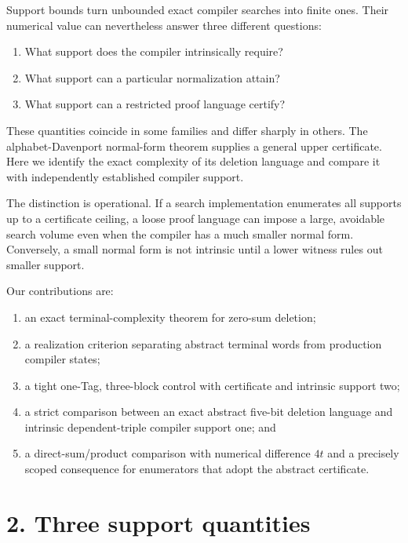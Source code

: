 \documentclass[
  11pt,
]{article}
\providecommand{\tightlist}{%
  \setlength{\itemsep}{0pt}\setlength{\parskip}{0pt}}
\begin{document}
Support bounds turn unbounded exact compiler searches into finite ones.
Their numerical value can nevertheless answer three different questions:

\begin{enumerate}
\def\labelenumi{\arabic{enumi}.}
\tightlist
\item
  What support does the compiler intrinsically require?
\item
  What support can a particular normalization attain?
\item
  What support can a restricted proof language certify?
\end{enumerate}

These quantities coincide in some families and differ sharply in others.
The alphabet-Davenport normal-form theorem supplies a general upper
certificate. Here we identify the exact complexity of its deletion
language and compare it with independently established compiler support.

The distinction is operational. If a search implementation enumerates
all supports up to a certificate ceiling, a loose proof language can
impose a large, avoidable search volume even when the compiler has a
much smaller normal form. Conversely, a small normal form is not
intrinsic until a lower witness rules out smaller support.

Our contributions are:

\begin{enumerate}
\def\labelenumi{\arabic{enumi}.}
\tightlist
\item
  an exact terminal-complexity theorem for zero-sum deletion;
\item
  a realization criterion separating abstract terminal words from
  production compiler states;
\item
  a tight one-Tag, three-block control with certificate and intrinsic
  support two;
\item
  a strict comparison between an exact abstract five-bit deletion
  language and intrinsic dependent-triple compiler support one; and
\item
  a direct-sum/product comparison with numerical difference \(4t\) and a
  precisely scoped consequence for enumerators that adopt the abstract
  certificate.
\end{enumerate}

\hypertarget{three-support-quantities}{%
\section{2. Three support quantities}\label{three-support-quantities}}
\end{document}
